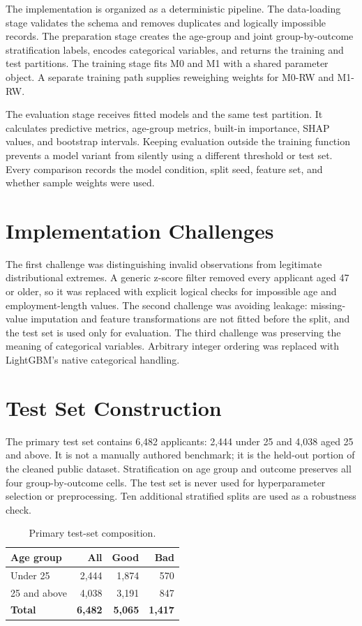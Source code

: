 The implementation is organized as a deterministic pipeline. The data-loading
stage validates the schema and removes duplicates and logically impossible
records. The preparation stage creates the age-group and joint
group-by-outcome stratification labels, encodes categorical variables, and
returns the training and test partitions. The training stage fits M0 and M1
with a shared parameter object. A separate training path supplies reweighing
weights for M0-RW and M1-RW.

The evaluation stage receives fitted models and the same test partition. It
calculates predictive metrics, age-group metrics, built-in importance, SHAP
values, and bootstrap intervals. Keeping evaluation outside the training
function prevents a model variant from silently using a different threshold or
test set. Every comparison records the model condition, split seed, feature
set, and whether sample weights were used.

\section{Implementation Challenges}

The first challenge was distinguishing invalid observations from legitimate
distributional extremes. A generic z-score filter removed every applicant
aged 47 or older, so it was replaced with explicit logical checks for impossible
age and employment-length values. The second challenge was avoiding leakage:
missing-value imputation and feature transformations are not fitted before the
split, and the test set is used only for evaluation. The third challenge was
preserving the meaning of categorical variables. Arbitrary integer ordering was
replaced with LightGBM's native categorical handling.

\section{Test Set Construction}

The primary test set contains 6,482 applicants: 2,444 under 25 and 4,038 aged
25 and above. It is not a manually authored benchmark; it is the held-out
portion of the cleaned public dataset. Stratification on age group and outcome
preserves all four group-by-outcome cells. The test set is never used for
hyperparameter selection or preprocessing. Ten additional stratified splits
are used as a robustness check.

\begin{table}[H]
\centering
\caption{Primary test-set composition.}
\label{tab:test-composition}
\begin{tabular}{lrrr}
\toprule
\textbf{Age group} & \textbf{All} & \textbf{Good} & \textbf{Bad}\\
\midrule
Under 25 & 2,444 & 1,874 & 570\\
25 and above & 4,038 & 3,191 & 847\\
\textbf{Total} & \textbf{6,482} & \textbf{5,065} & \textbf{1,417}\\
\bottomrule
\end{tabular}
\end{table}

